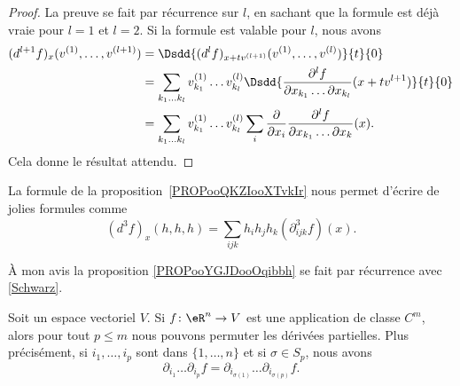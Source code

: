 \begin{proof}
	La preuve se fait par récurrence sur \( l\), en sachant que la formule est déjà vraie pour \( l=1\) et \( l=2\). Si la formule est valable pour \( l\), nous avons
	\begin{subequations}
		\begin{align}
			(d^{l+1}f)_x(v^{(1)},\ldots, v^{(l+1)}) & =\Dsdd{ (d^lf)_{x+tv^{(l+1)}}(v^{(1)},\ldots, v^{(l)}) }{t}{0}                                                                                                \\
			                                        & =\sum_{k_1\ldots k_l}v_{k_1}^{(1)}\ldots v_{k_l}^{(l)}\Dsdd{   \frac{ \partial^lf }{ \partial x_{k_1}\ldots \partial x_{k_l} }(x+tv^{l+1})   }{t}{0}          \\
			                                        & =\sum_{k_1\ldots k_l}v_{k_1}^{(1)}\ldots v_{k_l}^{(l)}\sum_i\frac{ \partial  }{ \partial x_i }\frac{ \partial^lf }{ \partial x_{k_1}\ldots \partial x_k }(x).
		\end{align}
	\end{subequations}
	Cela donne le résultat attendu.
\end{proof}

\begin{normaltext}
	La formule de la proposition~\ref{PROPooQKZIooXTvkIr} nous permet d'écrire de jolies formules comme
	\begin{equation}        \label{EQooXRWWooMoKoOB}
		(d^3f)_x(h,h,h)=\sum_{ijk}h_ih_jh_k(\partial^3_{ijk}f)(x).
	\end{equation}
\end{normaltext}

À mon avis la proposition \ref{PROPooYGJDooOqibbh} se fait par récurrence avec \ref{Schwarz}.		%

\begin{proposition}		\label{PROPooYGJDooOqibbh}
	Soit un espace vectoriel \( V\). Si \(f \colon \eR^n\to  V  \) est une application de classe \( C^m\), alors pour tout \( p\leq m\) nous pouvons permuter les dérivées partielles. Plus précisément, si \( i_1,\ldots, i_p\) sont dans \(\{ 1,\ldots,n \} \) et si \( \sigma\in S_p\), nous avons
	\begin{equation}
		\partial_{i_1}\ldots \partial_{i_p}f=\partial_{i_{\sigma(1)}}\ldots \partial_{i_{\sigma(p)}}f.
	\end{equation}
\end{proposition}


\ssdem
